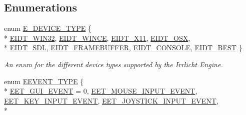 \subsection*{Enumerations}
\begin{DoxyCompactItemize}
\item 
enum \hyperlink{namespaceirr_ac25d94cf2e1037c7ca18ee79b3bd4505}{E\+\_\+\+D\+E\+V\+I\+C\+E\+\_\+\+T\+Y\+PE} \{ \\*
\hyperlink{namespaceirr_ac25d94cf2e1037c7ca18ee79b3bd4505a20fb61ff76bfa2269a5f9e41d50018f1}{E\+I\+D\+T\+\_\+\+W\+I\+N32}, 
\hyperlink{namespaceirr_ac25d94cf2e1037c7ca18ee79b3bd4505a839d8602c1a118791425d3df0d31ced1}{E\+I\+D\+T\+\_\+\+W\+I\+N\+CE}, 
\hyperlink{namespaceirr_ac25d94cf2e1037c7ca18ee79b3bd4505aa084c40bd6cc595378d28182dd74ff80}{E\+I\+D\+T\+\_\+\+X11}, 
\hyperlink{namespaceirr_ac25d94cf2e1037c7ca18ee79b3bd4505a140f80a523981af1487cd774e9a2a656}{E\+I\+D\+T\+\_\+\+O\+SX}, 
\\*
\hyperlink{namespaceirr_ac25d94cf2e1037c7ca18ee79b3bd4505ab9cafb4f0108f3fd5da94e886b529979}{E\+I\+D\+T\+\_\+\+S\+DL}, 
\hyperlink{namespaceirr_ac25d94cf2e1037c7ca18ee79b3bd4505a5516da97d0b6ef1708a3a13cdb157bee}{E\+I\+D\+T\+\_\+\+F\+R\+A\+M\+E\+B\+U\+F\+F\+ER}, 
\hyperlink{namespaceirr_ac25d94cf2e1037c7ca18ee79b3bd4505a54387cdabc602203abce675b027a3ede}{E\+I\+D\+T\+\_\+\+C\+O\+N\+S\+O\+LE}, 
\hyperlink{namespaceirr_ac25d94cf2e1037c7ca18ee79b3bd4505ad00f870da762af833dbab2eacc96ae0b}{E\+I\+D\+T\+\_\+\+B\+E\+ST}
 \}\begin{DoxyCompactList}\small\item\em An enum for the different device types supported by the Irrlicht Engine. \end{DoxyCompactList}
\item 
enum \hyperlink{namespaceirr_ac9eed96e06e85ce3c86fcbbbe9e48a0c}{E\+E\+V\+E\+N\+T\+\_\+\+T\+Y\+PE} \{ \\*
\hyperlink{namespaceirr_ac9eed96e06e85ce3c86fcbbbe9e48a0cae85bb44dd09a29c879d64a05047fc1d2}{E\+E\+T\+\_\+\+G\+U\+I\+\_\+\+E\+V\+E\+NT} = 0, 
\hyperlink{namespaceirr_ac9eed96e06e85ce3c86fcbbbe9e48a0caa230b748674e074aa67f661819ad5891}{E\+E\+T\+\_\+\+M\+O\+U\+S\+E\+\_\+\+I\+N\+P\+U\+T\+\_\+\+E\+V\+E\+NT}, 
\hyperlink{namespaceirr_ac9eed96e06e85ce3c86fcbbbe9e48a0ca6f90390f3147a1693e5e2e3422d6ca09}{E\+E\+T\+\_\+\+K\+E\+Y\+\_\+\+I\+N\+P\+U\+T\+\_\+\+E\+V\+E\+NT}, 
\hyperlink{namespaceirr_ac9eed96e06e85ce3c86fcbbbe9e48a0cac81558e4607ad260e96ae0f7b889e9a5}{E\+E\+T\+\_\+\+J\+O\+Y\+S\+T\+I\+C\+K\+\_\+\+I\+N\+P\+U\+T\+\_\+\+E\+V\+E\+NT}, 
\\*

\end{DoxyCompactItemize}
